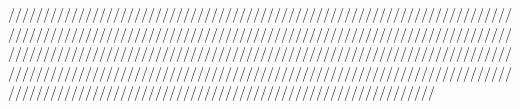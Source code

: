 \documentclass{article}
\begin{document}
\begin{Maple Normal}

\end{Maple Normal}
\begin{Maple Normal}

\end{Maple Normal}
\begin{Maple Normal}

\end{Maple Normal}
\begin{Maple Normal}

\end{Maple Normal}
\begin{Maple Normal}

\end{Maple Normal}
\begin{Maple Normal}

\end{Maple Normal}
\begin{Maple Normal}

\end{Maple Normal}
\begin{Maple Normal}

\end{Maple Normal}
\begin{Maple Normal}
/////////////////////////////////////////////////////////////////////////////////////////////////////////////////////////////////////////////////////////////////////////////////////////////////////////////////////////////////////////////////////////////////////////////////////////////////////////////////////////////////////////////////////////////
\end{Maple Normal}
\end{document}
